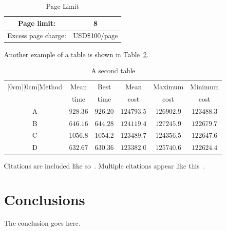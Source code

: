 \documentclass[conference]{IEEEtran}
\begin{document}
\begin{table}
\begin{center}
\renewcommand{\arraystretch}{1.3}
\caption{Page Limit}
\label{table-tab1}
\begin{tabular}{|c|c|}
\hline
Page limit: & 8\\
\hline
Excess page charge: & USD\$100/page\\
\hline
\end{tabular}
\end{center}
\end{table}

Another example of a table is shown in Table~\ref{table-tab2}.

\begin{table}[h]
\caption{A second table}
\begin{center}
\begin{tabular}{|c|c|c|c|c|c|}
\hline
\multicolumn{1}{|c|}{\raisebox{-1.50ex}[0cm][0cm]{\!Method\!}}
& \multicolumn{1}{|c|}{Mean}
& \multicolumn{1}{|c|}{Best}
& \multicolumn{1}{|c|}{Mean}
& \multicolumn{1}{|c|}{Maximum}
& \multicolumn{1}{|c|}{Minimum} \\
& time & time & cost & cost & cost\\ \hline
A      &  $928.36$  &  $926.20$  &  $124793.5$ & $126902.9$ & $123488.3$ \\ \hline
B      &  $646.16$  &  $644.28$  &  $124119.4$ & $127245.9$ & $122679.7$ \\ \hline
C      &  $1056.8$  &  $1054.2$  &  $123489.7$ & $124356.5$ & $122647.6$ \\ \hline
D      &  $632.67$  &  $630.36$  &  $123382.0$ & $125740.6$ & $122624.4$ \\ \hline
\end{tabular}
\label{table-tab2}
\end{center}
\end{table}

Citations are included like so~\cite{book}.
Multiple citations appear like this~\cite{conf,article}.

\section{Conclusions}
The conclusion goes here.
\end{document}
